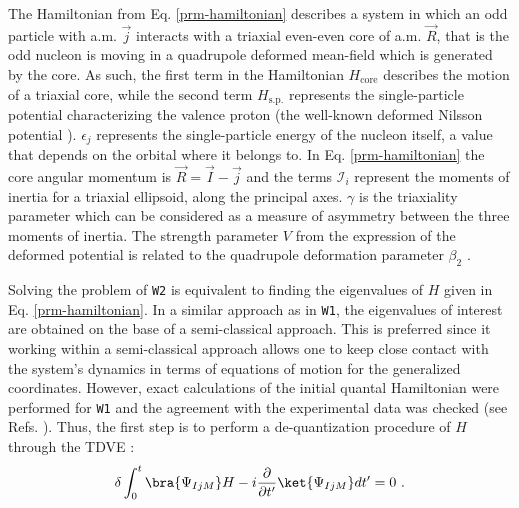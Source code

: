 \documentclass[myclassdoc,debug]{rjparticle}
\begin{document}
The Hamiltonian from Eq. \ref{prm-hamiltonian} describes a system in which an odd particle with a.m. $\vec{j}$ interacts with a triaxial even-even core of a.m. $\vec{R}$, that is the odd nucleon is moving in a quadrupole deformed mean-field which is generated by the core. As such, the first term in the Hamiltonian $H_\text{core}$ describes the motion of a triaxial core, while the second term $H_\text{s.p.}$ represents the single-particle potential characterizing the valence proton (the well-known deformed Nilsson potential \cite{meyer1975collective,wang2008description}). $\epsilon_j$ represents the single-particle energy of the nucleon itself, a value that depends on the orbital where it belongs to. In Eq. \ref{prm-hamiltonian} the core angular momentum is $\vec{R}=\vec{I}-\vec{j}$ and the terms $\mathcal{I}_i$ represent the moments of inertia for a triaxial ellipsoid, along the principal axes. $\gamma$ is the triaxiality parameter \cite{bohr1998nuclear} which can be considered as a measure of asymmetry between the three moments of inertia. The strength parameter $V$ from the expression of the deformed potential is related to the quadrupole deformation parameter $\beta_2$ \cite{bohr1998nuclear}.

Solving the problem of \texttt{W2} is equivalent to finding the eigenvalues of $H$ given in Eq. \ref{prm-hamiltonian}. In a similar approach as in \texttt{W1}, the eigenvalues of interest are obtained on the base of a semi-classical approach. This is preferred since it working within a semi-classical approach allows one to keep close contact with the system's dynamics in terms of equations of motion for the generalized coordinates. However, exact calculations of the initial quantal Hamiltonian were performed for \texttt{W1} and the agreement with the experimental data was checked (see Refs. \cite{raduta2020towards,raduta2020new}). Thus, the first step is to perform a de-quantization procedure of $H$ through the TDVE \cite{raduta2007semiclassical,budaca2018tilted,raduta2017semiclassical}:
\begin{align}
    \delta\int_0^t\bra{\Psi_{IjM}}H-i\frac{\partial}{\partial t'}\ket{\Psi_{IjM}}dt'=0\ .
    \label{tdve}
\end{align}
\end{document}
